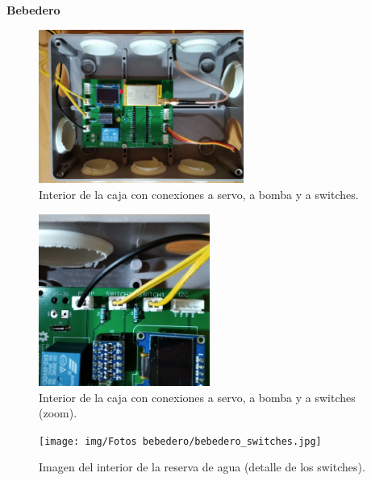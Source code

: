 \documentclass[12pt]{article}
\begin{document}
	\pagebreak
	
	\noindent \textbf{Bebedero} \\

	\begin{figure}[h!]
		\begin{center}
			\includegraphics[width=0.6\textwidth]{img/Fotos bebedero/caja_bomba_conexion_rotated.jpg}
			\caption{Interior de la caja con conexiones a servo, a bomba y a switches.}
			\label{Prototipo: bebedero conexiones}
		\end{center}
	\end{figure}

	
	\begin{figure}[h!]
		\begin{center}
			\includegraphics[width=0.5\textwidth]{img/Fotos bebedero/caja_bomba_conexion_zoom.jpg}
			\caption{Interior de la caja con conexiones a servo, a bomba y a switches (zoom).}
			\label{Prototipo: bebedero conexiones (zoom)}
		\end{center}
	\end{figure}

	\pagebreak
	
	\begin{figure}[h!]
		\begin{center}
			\texttt{[image: img/Fotos bebedero/bebedero\_switches.jpg]}
			\caption{Imagen del interior de la reserva de agua (detalle de los switches).}
			\label{Prototipo: reserva agua (detalle interior solo switches)}
		\end{center}
	\end{figure}
	
\end{document}
